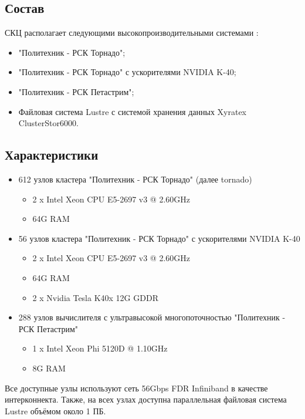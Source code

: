 \documentclass[a4paper, 12pt]{article}
\begin{document}
    \subsection{Состав}
    СКЦ располагает следующими высокопроизводительными системами \cite{scc}:
    \begin{itemize}
    \item "Политехник - РСК Торнадо";
    \item "Политехник - РСК Торнадо" с ускорителями NVIDIA K-40;
    \item "Политехник - РСК Петастрим";
    \item Файловая система Lustre с системой хранения данных Xyratex ClusterStor6000.
    \end{itemize}
    \subsection{Характеристики}
    \begin{itemize}
        \item 612 узлов кластера "Политехник - РСК Торнадо" (далее tornado)
        \begin{itemize}
            \item 2 x Intel Xeon CPU E5-2697 v3 @ 2.60GHz
            \item 64G RAM
        \end{itemize}
        \item 56 узлов кластера "Политехник - РСК Торнадо" с ускорителями NVIDIA K-40
        \begin{itemize}
            \item 2 x Intel Xeon CPU E5-2697 v3 @ 2.60GHz
            \item 64G RAM
            \item 2 x Nvidia Tesla K40x 12G GDDR
        \end{itemize}
        \item 288 узлов вычислителя с ультравысокой многопоточностью "Политехник - РСК Петастрим" 
        \begin{itemize}
            \item 1 x Intel Xeon Phi 5120D @ 1.10GHz
            \item 8G RAM
        \end{itemize}
    \end{itemize}
    
    Все доступные узлы используют сеть 56Gbps FDR Infiniband в качестве
    интерконнекта. Также, на всех узлах доступна параллельная файловая система Lustre объёмом около 1 ПБ.
    
\end{document}

